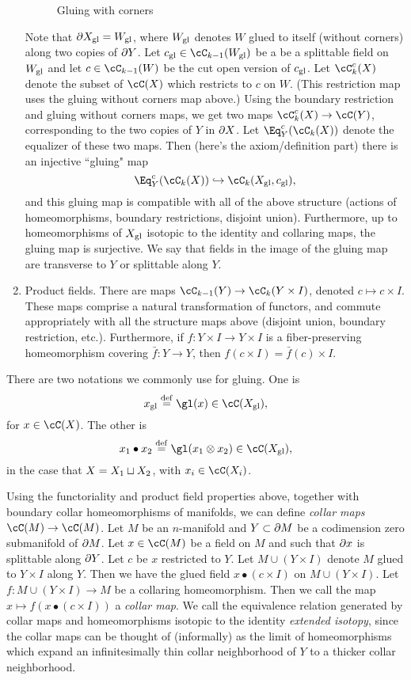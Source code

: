 \begin{enumerate}
\begin{figure}[t]
\begin{center}
\begin{tikzpicture}
\end{tikzpicture}
\end{center}
\caption{Gluing with corners}
\label{fig:gluing-with-corners}
\end{figure}
Note that $\bd X\sgl = W\sgl$, where $W\sgl$ denotes $W$ glued to itself
(without corners) along two copies of $\bd Y$.
Let $c\sgl \in \cC_{k-1}(W\sgl)$ be a be a splittable field on $W\sgl$ and let
$c \in \cC_{k-1}(W)$ be the cut open version of $c\sgl$.
Let $\cC^c_k(X)$ denote the subset of $\cC(X)$ which restricts to $c$ on $W$.
(This restriction map uses the gluing without corners map above.)
Using the boundary restriction and gluing without corners maps, 
we get two maps $\cC^c_k(X) \to \cC(Y)$, corresponding to the two
copies of $Y$ in $\bd X$.
Let $\Eq^c_Y(\cC_k(X))$ denote the equalizer of these two maps.
Then (here's the axiom/definition part) there is an injective ``gluing" map
\[
	\Eq^c_Y(\cC_k(X)) \hookrightarrow \cC_k(X\sgl, c\sgl) ,
\]
and this gluing map is compatible with all of the above structure (actions
of homeomorphisms, boundary restrictions, disjoint union).
Furthermore, up to homeomorphisms of $X\sgl$ isotopic to the identity
and collaring maps,
the gluing map is surjective.
We say that fields in the image of the gluing map
are transverse to $Y$ or splittable along $Y$.
\item Product fields.
There are maps $\cC_{k-1}(Y) \to \cC_k(Y \times I)$, denoted
$c \mapsto c\times I$.
These maps comprise a natural transformation of functors, and commute appropriately
with all the structure maps above (disjoint union, boundary restriction, etc.).
Furthermore, if $f: Y\times I \to Y\times I$ is a fiber-preserving homeomorphism
covering $\bar{f}:Y\to Y$, then $f(c\times I) = \bar{f}(c)\times I$.
\end{enumerate}

There are two notations we commonly use for gluing.
One is 
\[
	x\sgl \deq \gl(x) \in \cC(X\sgl) , 
\]
for $x\in\cC(X)$.
The other is
\[
	x_1\bullet x_2 \deq \gl(x_1\otimes x_2) \in \cC(X\sgl) , 
\]
in the case that $X = X_1 \du X_2$, with $x_i \in \cC(X_i)$.

\medskip

Using the functoriality and product field properties above, together
with boundary collar homeomorphisms of manifolds, we can define 
{\it collar maps} $\cC(M)\to \cC(M)$.
Let $M$ be an $n$-manifold and $Y \subset \bd M$ be a codimension zero submanifold
of $\bd M$.
Let $x \in \cC(M)$ be a field on $M$ and such that $\bd x$ is splittable along $\bd Y$.
Let $c$ be $x$ restricted to $Y$.
Let $M \cup (Y\times I)$ denote $M$ glued to $Y\times I$ along $Y$.
Then we have the glued field $x \bullet (c\times I)$ on $M \cup (Y\times I)$.
Let $f: M \cup (Y\times I) \to M$ be a collaring homeomorphism.
Then we call the map $x \mapsto f(x \bullet (c\times I))$ a {\it collar map}.
We call the equivalence relation generated by collar maps and
homeomorphisms isotopic to the identity {\it extended isotopy}, since the collar maps
can be thought of (informally) as the limit of homeomorphisms
which expand an infinitesimally thin collar neighborhood of $Y$ to a thicker
collar neighborhood.


